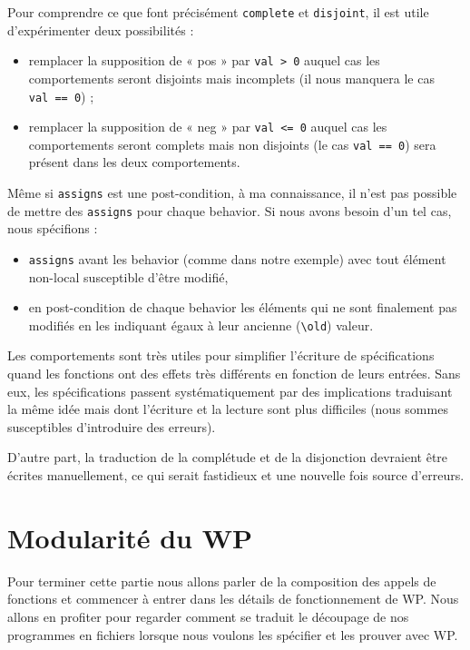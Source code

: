 \documentclass[12pt,francais,]{scrbook}
\providecommand{\tightlist}{%
  \setlength{\itemsep}{0pt}\setlength{\parskip}{0pt}}
\newenvironment{zdsalertblock}[1]{%
  \tcolorbox[beamer,%
    noparskip,breakable,
    colback=LightCoral,colframe=DarkRed,%
    colbacklower=Tomato,%
    title=#1]
}{\endtcolorbox}
\begin{document}
Pour comprendre ce que font précisément \texttt{complete} et
\texttt{disjoint}, il est utile d'expérimenter deux possibilités :

\begin{itemize}
\tightlist
\item
  remplacer la supposition de « pos » par
  \texttt{val\ \textgreater{}\ 0} auquel cas les comportements seront
  disjoints mais incomplets (il nous manquera le cas
  \texttt{val\ ==\ 0}) ;
\item
  remplacer la supposition de « neg » par \texttt{val\ \textless{}=\ 0}
  auquel cas les comportements seront complets mais non disjoints (le
  cas \texttt{val\ ==\ 0}) sera présent dans les deux comportements.
\end{itemize}

\begin{zdsalertblock}{Attention}
  Même si \texttt{assigns} est une
  post-condition, à ma connaissance, il n'est pas possible de
  mettre des \texttt{assigns} pour chaque behavior. Si nous avons
  besoin d'un tel cas, nous spécifions :
  \begin{itemize}
  \item \texttt{assigns} avant les behavior (comme dans notre exemple) avec
    tout élément non-local susceptible d'être modifié,
  \item en post-condition de chaque behavior les éléments qui ne sont
    finalement pas modifiés en les indiquant égaux à leur
    ancienne (\texttt{\textbackslash{}old}) valeur.
  \end{itemize}
\end{zdsalertblock}

Les comportements sont très utiles pour simplifier l'écriture de
spécifications quand les fonctions ont des effets très différents en
fonction de leurs entrées. Sans eux, les spécifications passent
systématiquement par des implications traduisant la même idée mais dont
l'écriture et la lecture sont plus difficiles (nous sommes susceptibles
d'introduire des erreurs).

D'autre part, la traduction de la complétude et de la disjonction
devraient être écrites manuellement, ce qui serait fastidieux et une
nouvelle fois source d'erreurs.

\section{Modularité du WP}\label{modularituxe9-du-wp}

Pour terminer cette partie nous allons parler de la composition des
appels de fonctions et commencer à entrer dans les détails de
fonctionnement de WP. Nous allons en profiter pour regarder comment se
traduit le découpage de nos programmes en fichiers lorsque nous voulons
les spécifier et les prouver avec WP.
\end{document}
